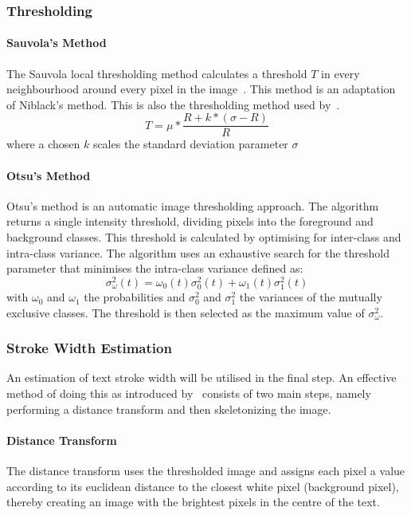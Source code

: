 \documentclass[a4paper, 12pt]{report}
\begin{document}
\subsubsection{Thresholding}

\paragraph{Sauvola's Method}
The Sauvola local thresholding method calculates a threshold $T$ in every
neighbourhood around every pixel in the image~\cite{scikit-image}. This method
is an adaptation of Niblack's method. This is also the thresholding method used
by~\cite{gatos2006adaptive}.
\[T=\mu*\frac{R+k*(\sigma-R)}{R}\]
where a chosen $k$ scales the standard deviation parameter $\sigma$

\paragraph{Otsu's Method}
Otsu's method is an automatic image thresholding approach. The algorithm
returns a single intensity threshold, dividing pixels into the foreground and
background classes. This threshold is calculated by optimising for inter-class
and intra-class variance. The algorithm uses an exhaustive search for the
threshold parameter that minimises the intra-class variance defined as:
\[\sigma_{\omega}^{2}(t)=\omega_0(t)\sigma_0^2(t)+\omega_1(t)\sigma_1^2(t)\]
with $\omega_0$ and $\omega_1$ the probabilities and $\sigma_0^2$ and
$\sigma_1^2$ the variances of the mutually exclusive classes. The threshold is
then selected as the maximum value of $\sigma_{\omega}^{2}$.

\subsubsection{Stroke Width Estimation}
An estimation of text stroke width will be utilised in the final step. An
effective method of doing this as introduced by~\cite{strokewidth} consists of
two main steps, namely performing a distance transform and then skeletonizing
the image.

\paragraph{Distance Transform}
The distance transform uses the thresholded image and assigns each pixel a
value according to its euclidean distance to the closest white pixel
(background pixel), thereby creating an image with the brightest pixels in the
centre of the text.
\end{document}
